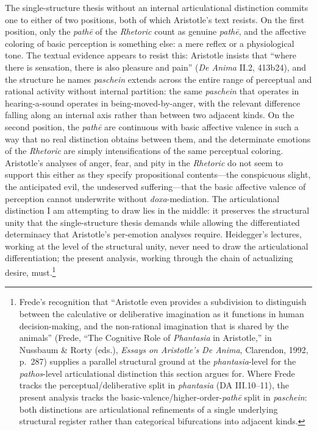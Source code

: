 The single-structure thesis without an internal articulational distinction commits one to either of two positions, both of which Aristotle's text resists. On the first position, only the \textit{pathē} of the \textit{Rhetoric} count as genuine \textit{pathē}, and the affective coloring of basic perception is something else: a mere reflex or a physiological tone. The textual evidence appears to resist this: Aristotle insists that ``where there is sensation, there is also pleasure and pain'' (\textit{De Anima} II.2, 413b24), and the structure he names \textit{paschein} extends across the entire range of perceptual and rational activity without internal partition: the same \textit{paschein} that operates in hearing-a-sound operates in being-moved-by-anger, with the relevant difference falling along an internal axis rather than between two adjacent kinds. On the second position, the \textit{pathē} are continuous with basic affective valence in such a way that no real distinction obtains between them, and the determinate emotions of the \textit{Rhetoric} are simply intensifications of the same perceptual coloring. Aristotle's analyses of anger, fear, and pity in the \textit{Rhetoric} do not seem to support this either as they specify propositional contents---the conspicuous slight, the anticipated evil, the undeserved suffering---that the basic affective valence of perception cannot underwrite without \textit{doxa}-mediation. The articulational distinction I am attempting to draw lies in the middle: it preserves the structural unity that the single-structure thesis demands while allowing the differentiated determinacy that Aristotle's per-emotion analyses require. Heidegger's lectures, working at the level of the structural unity, never need to draw the articulational differentiation; the present analysis, working through the chain of actualizing desire, must.\footnote{Frede's recognition that ``Aristotle even provides a subdivision to distinguish between the calculative or deliberative imagination as it functions in human decision-making, and the non-rational imagination that is shared by the animals'' (Frede, ``The Cognitive Role of \textit{Phantasia} in Aristotle,'' in Nussbaum \& Rorty (eds.), \textit{Essays on Aristotle's De Anima}, Clarendon, 1992, p.~287) supplies a parallel structural ground at the \textit{phantasia}-level for the \textit{pathos}-level articulational distinction this section argues for. Where Frede tracks the perceptual/deliberative split in \textit{phantasia} (DA III.10--11), the present analysis tracks the basic-valence/higher-order-\textit{pathē} split in \textit{paschein}: both distinctions are articulational refinements of a single underlying structural register rather than categorical bifurcations into adjacent kinds.}

